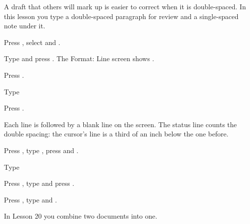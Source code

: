 A draft that others will mark up is easier to correct when it is
double-spaced.  In this lesson you type a double-spaced paragraph for review
and a single-spaced note under it.

\begin{WPSteps}
\item Press , select  and
.
\item Type  and press .  The Format: Line screen
shows .
\item Press .
\end{WPSteps}

\begin{WPSteps}
\item Type
\item Press .
\end{WPSteps}
Each line is followed by a blank line on the screen.  The status line counts
the double spacing: the cursor's line is a third of an inch below the one
before.

\begin{WPSteps}
\item Press , type , press
 and .
\item Type 
\end{WPSteps}

\begin{WPSteps}
\item Press , type  and press
.
\item Press , type  and .
\end{WPSteps}
\EndReplay
In Lesson 20 you combine two documents into one.

